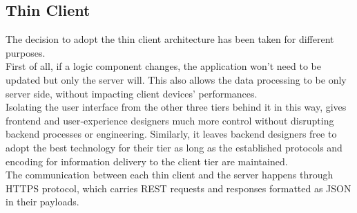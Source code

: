 \documentclass[../../../DD.tex]{subfiles}
\begin{document}
	
	\subsection{Thin Client\label{subsect:2.6.2}}
	The decision to adopt the thin client architecture has been taken for different purposes. \\
	First of all, if a logic component changes, the application won't need to be updated but only the server will. This also allows the data processing to be only server side, without impacting client devices' performances. \\
	
	Isolating the user interface from the other three tiers behind it in this way, gives frontend and user‑experience designers much more control without disrupting backend processes or engineering. Similarly, it leaves backend designers free to adopt the best technology for their tier as long as the established protocols and encoding for information delivery to the client tier are maintained.\\
	
	The communication between each thin client and the server happens through HTTPS protocol, which carries REST requests and responses formatted as JSON in their payloads.
\end{document}
